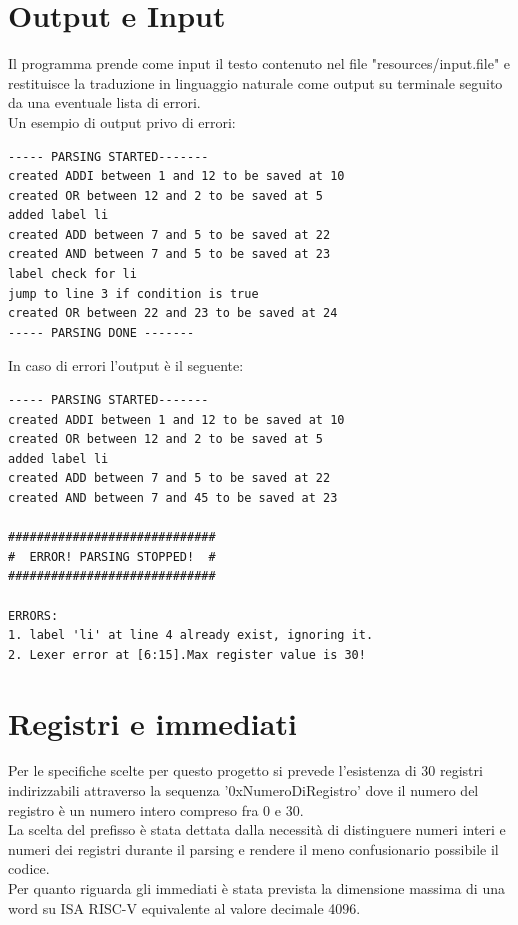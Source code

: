 \section{Output e Input}
Il programma prende come input il testo contenuto nel file "resources/input.file" e restituisce la traduzione in linguaggio naturale come output su terminale seguito da una eventuale lista di errori.
\\Un esempio di output privo di errori:
\begin{lstlisting}
----- PARSING STARTED-------
created ADDI between 1 and 12 to be saved at 10
created OR between 12 and 2 to be saved at 5
added label li
created ADD between 7 and 5 to be saved at 22
created AND between 7 and 5 to be saved at 23
label check for li
jump to line 3 if condition is true
created OR between 22 and 23 to be saved at 24
----- PARSING DONE -------
\end{lstlisting}
In caso di errori l'output è il seguente:
\begin{lstlisting}
----- PARSING STARTED-------
created ADDI between 1 and 12 to be saved at 10
created OR between 12 and 2 to be saved at 5
added label li
created ADD between 7 and 5 to be saved at 22
created AND between 7 and 45 to be saved at 23

#############################
#  ERROR! PARSING STOPPED!  #
#############################

ERRORS:
1. label 'li' at line 4 already exist, ignoring it.
2. Lexer error at [6:15].Max register value is 30!
\end{lstlisting}






\section{Registri e immediati}
Per le specifiche scelte per questo progetto si prevede l'esistenza di 30 registri indirizzabili attraverso la sequenza '0xNumeroDiRegistro' dove il numero del registro è un numero intero compreso fra 0 e 30.
\\La scelta del prefisso è stata dettata dalla necessità di distinguere numeri interi e numeri dei registri durante il parsing e rendere il meno confusionario possibile il codice.
\\Per quanto riguarda gli immediati è stata prevista la dimensione massima di una word su ISA RISC-V equivalente al valore decimale 4096.
